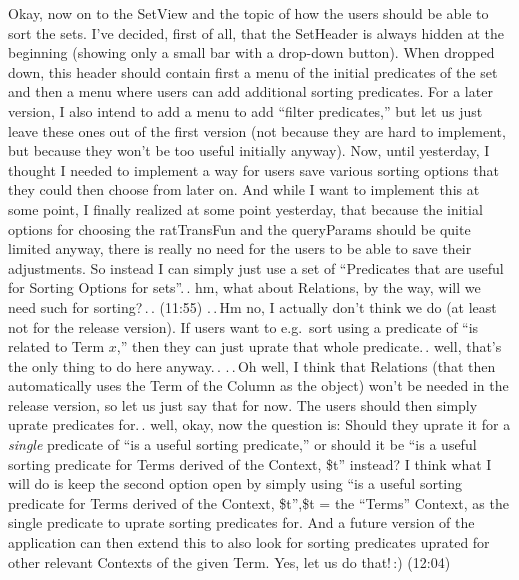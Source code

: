 \documentclass{report}
\begin{document}
Okay, now on to the SetView and the topic of how the users should be able to sort the sets. I've decided, first of all, that the SetHeader is always hidden at the beginning (showing only a small bar with a drop-down button). When dropped down, this header should contain first a menu of the initial predicates of the set and then a menu where users can add additional sorting predicates. For a later version, I also intend to add a menu to add ``filter predicates,'' but let us just leave these ones out of the first version (not because they are hard to implement, but because they won't be too useful initially anyway). Now, until yesterday, I thought I needed to implement a way for users save various sorting options that they could then choose from later on. And while I want to implement this at some point, I finally realized at some point yesterday, that because the initial options for choosing the ratTransFun and the queryParams should be quite limited anyway, there is really no need for the users to be able to save their adjustments. So instead I can simply just use a set of ``Predicates that are useful for Sorting Options for sets''.\,. hm, what about Relations, by the way, will we need such for sorting?\,.\,. (11:55) .\,.\,Hm no, I actually don't think we do (at least not for the release version). If users want to e.g.\ sort using a predicate of ``is related to Term $x$,'' then they can just uprate that whole predicate.\,. well, that's the only thing to do here anyway.\,. .\,.\,Oh well, I think that Relations (that then automatically uses the Term of the Column as the object) won't be needed in the release version, so let us just say that for now. The users should then simply uprate predicates for.\,. well, okay, now the question is: Should they uprate it for a \emph{single} predicate of ``is a useful sorting predicate,'' or should it be ``is a useful sorting predicate for Terms derived of the Context, \$t'' instead? I think what I will do is keep the second option open by simply using ``is a useful sorting predicate for Terms derived of the Context, \$t'',\$t = the ``Terms'' Context, as the single predicate to uprate sorting predicates for. And a future version of the application can then extend this to also look for sorting predicates uprated for other relevant Contexts of the given Term. Yes, let us do that!\,:) (12:04)
\end{document}
